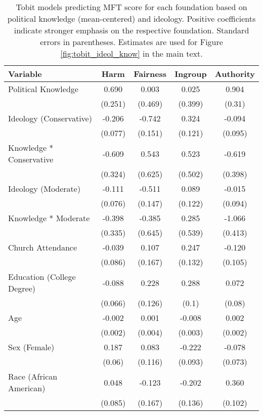 \begin{table}[ht]
\centering
\caption{Tobit models predicting MFT score for each foundation based 
           on political knowledge (mean-centered) and ideology. Positive coefficients indicate stronger 
           emphasis on the respective foundation. Standard errors in parentheses. Estimates are used 
           for Figure \ref{fig:tobit_ideol_know} in the main text.} 
\label{tab:tobit_ideol_know}
\begingroup\footnotesize
\begin{tabular}{lcccc}
  \hline
Variable & Harm & Fairness & Ingroup & Authority \\ 
  \hline
Political Knowledge &  0.690 &  0.003 &  0.025 &  0.904 \\ 
   & (0.251) & (0.469) & (0.399) & (0.31) \\ 
  Ideology (Conservative) & -0.206 & -0.742 &  0.324 & -0.094 \\ 
   & (0.077) & (0.151) & (0.121) & (0.095) \\ 
  Knowledge * Conservative & -0.609 &  0.543 &  0.523 & -0.619 \\ 
   & (0.324) & (0.625) & (0.502) & (0.398) \\ 
  Ideology (Moderate) & -0.111 & -0.511 &  0.089 & -0.015 \\ 
   & (0.076) & (0.147) & (0.122) & (0.094) \\ 
  Knowledge * Moderate & -0.398 & -0.385 &  0.285 & -1.066 \\ 
   & (0.335) & (0.645) & (0.539) & (0.413) \\ 
  Church Attendance & -0.039 &  0.107 &  0.247 & -0.120 \\ 
   & (0.086) & (0.167) & (0.132) & (0.105) \\ 
  Education (College Degree) & -0.088 &  0.228 &  0.288 &  0.072 \\ 
   & (0.066) & (0.126) & (0.1) & (0.08) \\ 
  Age & -0.002 &  0.001 & -0.008 &  0.002 \\ 
   & (0.002) & (0.004) & (0.003) & (0.002) \\ 
  Sex (Female) &  0.187 &  0.083 & -0.222 & -0.078 \\ 
   & (0.06) & (0.116) & (0.093) & (0.073) \\ 
  Race (African American) &  0.048 & -0.123 & -0.202 &  0.360 \\ 
   & (0.085) & (0.167) & (0.136) & (0.102) \\ 

\end{tabular}
\end{table}

